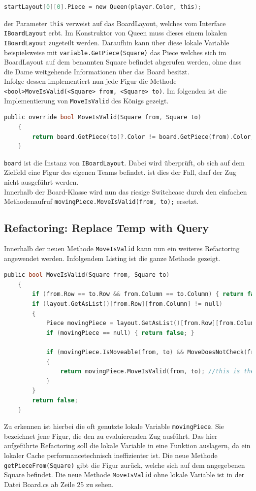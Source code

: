\documentclass[
10pt, %
a4paper, %
oneside, %
headinclude,footinclude, %
BCOR5mm, %
]{scrartcl}
\begin{document}
	\begin{lstlisting}[language=c, style=mStyle]
	startLayout[0][0].Piece = new Queen(player.Color, this);
	\end{lstlisting}

	 der Parameter \texttt{this} verweist auf das BoardLayout, welches vom Interface \texttt{IBoardLayout} erbt. Im Konstruktor von Queen muss dieses einem lokalen \texttt{IBoardLayout} zugeteilt werden. Daraufhin kann über diese lokale Variable beispielsweise mit \texttt{variable.GetPiece(Square)} das Piece welches sich im BoardLayout auf dem benannten Square befindet abgerufen werden, ohne dass die Dame weitgehende Informationen über das Board besitzt.\\
	 Infolge dessen implementiert nun jede Figur die Methode \texttt{<bool>MoveIsValid(<Square> from, <Square> to)}. Im folgenden ist die Implementierung von \texttt{MoveIsValid} des Königs gezeigt.

	 \begin{lstlisting}[language=c, style=mStyle]
	public override bool MoveIsValid(Square from, Square to)
	{
		return board.GetPiece(to)?.Color != board.GetPiece(from).Color;
	}
	 \end{lstlisting}
	
	 \texttt{board} ist die Instanz von \texttt{IBoardLayout}. Dabei wird überprüft, ob sich auf dem Zielfeld eine Figur des eigenen Teams befindet. ist dies der Fall, darf der Zug nicht ausgeführt werden.\\
	 Innerhalb der Board-Klasse wird nun das riesige Switchcase durch den einfachen Methodenaufruf \texttt{movingPiece.MoveIsValid(from, to);} ersetzt.

	 \subsection{Refactoring: Replace Temp with Query}
	 Innerhalb der neuen Methode \texttt{MoveIsValid} kann nun ein weiteres Refactoring angewendet werden. Infolgendem Listing ist die ganze Methode gezeigt.

	 \begin{lstlisting}[language=c, style=mStyle]
	public bool MoveIsValid(Square from, Square to)
	{
		if (from.Row == to.Row && from.Column == to.Column) { return false; }
		if (layout.GetAsList()[from.Row][from.Column] != null)
		{
			Piece movingPiece = layout.GetAsList()[from.Row][from.Column]?.Piece;
			if (movingPiece == null) { return false; }

			if (movingPiece.IsMoveable(from, to) && MoveDoesNotCheck(from, to)) //hehe, codesmell
			{
				return movingPiece.MoveIsValid(from, to); //this is the way!!!                    
			}
		}
		return false;
	}
	 \end{lstlisting}
	 Zu erkennen ist hierbei die oft genutzte lokale Variable \texttt{movingPiece}. Sie bezeichnet jene Figur, die den zu evaluierenden Zug ausführt. Das hier aufgeführte Refactoring soll die lokale Variable in eine Funktion auslagern, da ein lokaler Cache performancetechnisch ineffizienter ist. Die neue Methode \texttt{getPieceFrom(Square)} gibt die Figur zurück, welche sich auf dem angegebenen Square befindet. Die neue Methode \texttt{MoveIsValid} ohne lokale Variable ist in der Datei Board.cs ab Zeile 25 zu sehen.
\end{document}
